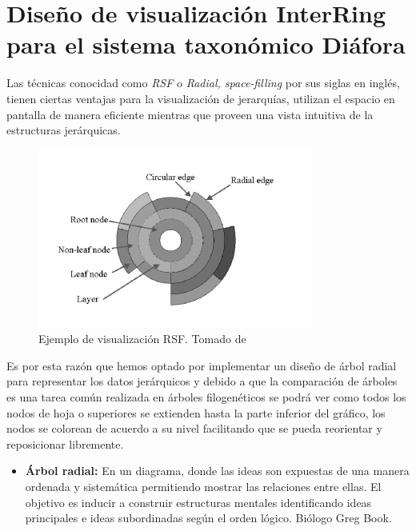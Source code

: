 \documentclass[journal]{IEEEtran}
\begin{document}
\section{Diseño de visualización InterRing para el sistema taxonómico Diáfora}
Las técnicas conocidad como \emph{RSF} o \emph{Radial, space-filling} por sus siglas en inglés,
 tienen ciertas ventajas
para la visualización de jerarquías, utilizan el espacio en pantalla de manera eficiente mientras que proveen una vista intuitiva 
de la estructuras jerárquicas.
\begin{figure}[]
  \centering
  \includegraphics[scale=0.6]{interring}
  \caption{Ejemplo de visualización RSF. Tomado  de \cite{yang_ward_rundensteiner}}
\end{figure}

Es por esta razón que hemos optado por implementar un diseño de árbol radial  \cite{sancho-study} para representar los datos jerárquicos y debido a que la comparación de árboles es una tarea común realizada en árboles filogenéticos se podrá ver como todos los nodos de hoja o superiores se extienden hasta la parte inferior del gráfico, 
los nodos se colorean de acuerdo a su nivel facilitando que se pueda reorientar y reposicionar libremente. 


\begin{itemize}
  \item \textbf{Árbol radial:} En un diagrama, donde las ideas son expuestas de una manera ordenada y sistemática permitiendo mostrar las relaciones entre ellas. 
  El objetivo es inducir a construir estructuras mentales identificando ideas principales e ideas subordinadas según el orden lógico. Biólogo Greg Book.
\end{itemize}
\end{document}
